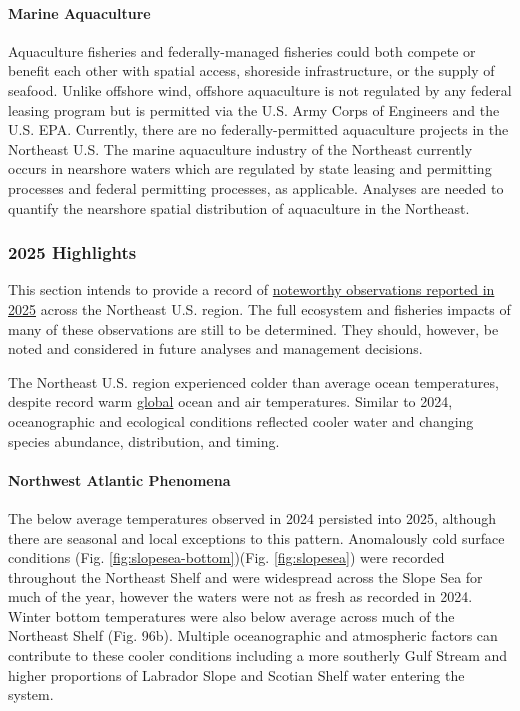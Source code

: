 \documentclass[
  10pt,
]{article}
\begin{document}
\paragraph{Marine Aquaculture}\label{marine-aquaculture}

Aquaculture fisheries and federally-managed fisheries could both compete or benefit each other with spatial access, shoreside infrastructure, or the supply of seafood. Unlike offshore wind, offshore aquaculture is not regulated by any federal leasing program but is permitted via the U.S. Army Corps of Engineers and the U.S. EPA. Currently, there are no federally-permitted aquaculture projects in the Northeast U.S. The marine aquaculture industry of the Northeast currently occurs in nearshore waters which are regulated by state leasing and permitting processes and federal permitting processes, as applicable. Analyses are needed to quantify the nearshore spatial distribution of aquaculture in the Northeast.

\newpage

\subsubsection{2025 Highlights}\label{highlights}

This section intends to provide a record of \href{https://noaa-edab.github.io/catalog/observation_synthesis_2025.html}{noteworthy observations reported in 2025} across the Northeast U.S. region. The full ecosystem and fisheries impacts of many of these observations are still to be determined. They should, however, be noted and considered in future analyses and management decisions.

The Northeast U.S. region experienced colder than average ocean temperatures, despite record warm \href{https://www.ncei.noaa.gov/news/global-climate-202513}{global} ocean and air temperatures. Similar to 2024, oceanographic and ecological conditions reflected cooler water and changing species abundance, distribution, and timing.

\paragraph{Northwest Atlantic Phenomena}\label{northwest-atlantic-phenomena}

The below average temperatures observed in 2024 persisted into 2025, although there are seasonal and local exceptions to this pattern. Anomalously cold surface conditions (Fig. \ref{fig:slopesea-bottom})(Fig. \ref{fig:slopesea}) were recorded throughout the Northeast Shelf and were widespread across the Slope Sea for much of the year, however the waters were not as fresh as recorded in 2024. Winter bottom temperatures were also below average across much of the Northeast Shelf (Fig. 96b). Multiple oceanographic and atmospheric factors can contribute to these cooler conditions including a more southerly Gulf Stream and higher proportions of Labrador Slope and Scotian Shelf water entering the system.
\end{document}
